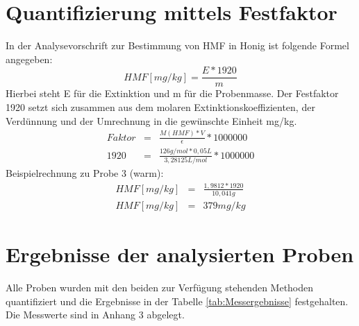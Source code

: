 \section{Quantifizierung mittels Festfaktor}
In der Analysevorschrift zur Bestimmung von HMF in Honig ist folgende Formel angegeben:
    \[HMF[mg/kg]=\frac{ E * 1920 }{ m }\]
    Hierbei steht E für die Extinktion und m für die Probenmasse. Der Festfaktor 1920 setzt sich zusammen aus dem molaren Extinktionskoeffizienten, der Verdünnung und der Umrechnung in die gewünschte Einheit mg/kg.
\begin{eqnarray*}
    Faktor&=&\frac{ M(HMF)*V }{ \epsilon }*1000000\\
    1920&=&\frac{ 126g/mol * 0,05L }{ 3,28125L/mol }*1000000
\end{eqnarray*}
Beispielrechnung zu Probe 3 (warm):
\begin{eqnarray*}
    HMF[mg/kg]&=&\frac{ 1,9812 * 1920 }{ 10,041g }\\
    HMF[mg/kg]&=&379mg/kg
\end{eqnarray*}

\newpage
\section{Ergebnisse der analysierten Proben}
Alle Proben wurden mit den beiden zur Verfügung stehenden Methoden quantifiziert und die Ergebnisse in der Tabelle \ref{tab:Messergebnisse} festgehalten. Die Messwerte sind in Anhang 3 abgelegt.

